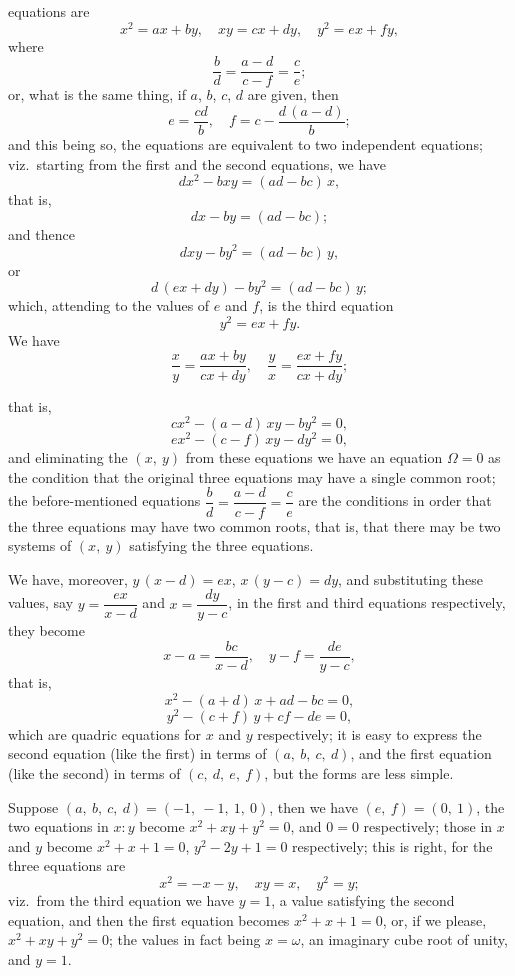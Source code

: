 \documentclass[11pt,a4paper]{article}
\providecommand{\textsc}[1]{{\scshape #1}}
\begin{document}
\medskip
\noindent \textsc{The} equations are
\[
x^{2} = ax + by,\quad xy = cx + dy,\quad y^{2} = ex + fy,
\]
where
\[
\frac{b}{d} = \frac{a - d}{c - f} = \frac{c}{e};
\]
or, what is the same thing, if $a$, $b$, $c$, $d$ are given, then
\[
e = \frac{cd}{b},\quad f = c - \frac{d\,(a - d)}{b};
\]
and this being so, the equations are equivalent to two independent equations; viz.\ starting from the first and the second equations, we have
\[
dx^{2} - bxy = (ad - bc)\,x,
\]
that is,
\[
dx - by = (ad - bc);
\]
and thence
\[
dxy - by^{2} = (ad - bc)\,y,
\]
or
\[
d\,(ex + dy) - by^{2} = (ad - bc)\,y;
\]
which, attending to the values of $e$ and $f$, is the third equation
\[
y^{2} = ex + fy.
\]
We have
\[
\frac{x}{y} = \frac{ax + by}{cx + dy},\quad \frac{y}{x} = \frac{ex + fy}{cx + dy};
\]
\clearpage

\fancyhead[L]{\small 810]}
\fancyhead[C]{\small\textsc{note on a system of equations.}}

\thispagestyle{plain}
\noindent that is,
\[
cx^{2} - (a - d)\,xy - by^{2} = 0,
\]
\[
ex^{2} - (c - f)\,xy - dy^{2} = 0,
\]
and eliminating the $(x,\ y)$ from these equations we have an equation $\Omega = 0$ as the condition that the original three equations may have a single common root; the before-mentioned equations $\dfrac{b}{d} = \dfrac{a - d}{c - f} = \dfrac{c}{e}$ are the conditions in order that the three equations may have two common roots, that is, that there may be two systems of $(x,\ y)$ satisfying the three equations.

\medskip
We have, moreover, $y\,(x - d) = ex$, $x\,(y - c) = dy$, and substituting these values, say $y = \dfrac{ex}{x - d}$ and $x = \dfrac{dy}{y - c}$, in the first and third equations respectively, they become
\[
x - a = \frac{bc}{x - d},\quad y - f = \frac{de}{y - c},
\]
that is,
\[
x^{2} - (a + d)\,x + ad - bc = 0,
\]
\[
y^{2} - (c + f)\,y + cf - de = 0,
\]
which are quadric equations for $x$ and $y$ respectively; it is easy to express the second equation (like the first) in terms of $(a,\ b,\ c,\ d)$, and the first equation (like the second) in terms of $(c,\ d,\ e,\ f)$, but the forms are less simple.

\medskip
Suppose $(a,\ b,\ c,\ d) = (-1,\ -1,\ 1,\ 0)$, then we have $(e,\ f) = (0,\ 1)$, the two equations in $x : y$ become $x^{2} + xy + y^{2} = 0$, and $0 = 0$ respectively; those in $x$ and $y$ become $x^{2} + x + 1 = 0$, $y^{2} - 2y + 1 = 0$ respectively; this is right, for the three equations are
\[
x^{2} = -x - y,\quad xy = x,\quad y^{2} = y;
\]
viz.\ from the third equation we have $y = 1$, a value satisfying the second equation, and then the first equation becomes $x^{2} + x + 1 = 0$, or, if we please, $x^{2} + xy + y^{2} = 0$; the values in fact being $x = \omega$, an imaginary cube root of unity, and $y = 1$.
\end{document}
